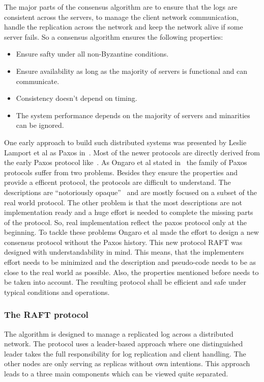 The major parts of the consensus algorithm are to ensure that the logs are
consistent across the servers, to manage the client network communication,
handle the replication across the network and keep the network alive if
some server fails. So a consensus algorithm ensures the following properties:~\cite{ongaro2014search}

\begin{itemize}
\item Ensure safty under all non-Byzantine conditions.
\item Ensure availability as long as the majority of servers is
  functional and can communicate.
\item Consistency doesn't depend on timing.
\item The system performance depends on the majority of servers
  and minarities can be ignored.
\end{itemize}

One early approach to build such distributed systems was presented by
Leslie Lamport et al as Paxos in~\cite{lamport1978time}.
Most of the newer protocols are directly derived from the early Paxos
protocol like~\cite{lamport2001paxos, van2015paxos}.
As Ongaro et al stated in~\cite{ongaro2014search} the family of
Paxos protocols suffer from two problems. Besides they ensure the
properties and provide a efficent protocol, the protocols are
difficult to understand. The descriptions are ``notoriously
opaque''~\cite{ongaro2014search} and are mostly focused on a
subset of the real world protocol. The other problem is that the
most descriptions are not implementation ready and a huge effort
is needed to complete the missing parts of the protocol.
So, real implementation reflect the paxos protocol only at
the beginning. To tackle these problems Ongaro et al made
the effort to design a new consensus protocol without the
Paxos history. This new protocol RAFT was designed with
understandability in mind. This means, that the implementers
effort needs to be minimized and the description and pseudo-code
needs to be as close to the real world as possible. Also,
the properties mentioned before needs to be taken into account.
The resulting protocol shall be efficient and safe under
typical conditions and operations.~\cite{ongaro2014search}



\subsubsection*{The RAFT protocol}
The algorithm is designed to manage a replicated log
across a distributed network. The protocol uses a leader-based
approach where one distinguished leader takes the full responsibility
for log replication and client handling. The other nodes are
only serving as replicas without own intentions. This approach
leads to a three main components which can be viewed quite separated.~\cite{ongaro2014search}

